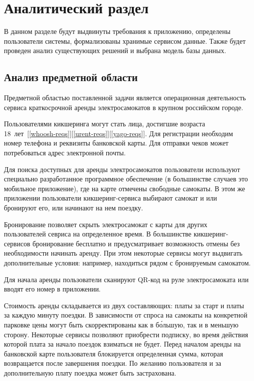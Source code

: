\chapter{Аналитический раздел}

В данном разделе будут выдвинуты требования к приложению, определены пользователи системы, формализованы хранимые сервисом данные. Также будет проведен анализ существующих решений и выбрана модель базы данных.

\section{Анализ предметной области}

Предметной областью поставленной задачи является операционная деятельность сервиса краткосрочной аренды электросамокатов в крупном российском городе.

Пользователями кикшеринга могут стать лица, достигшие возраста 18~лет~[\ref{whoosh-reqs}][\ref{urent-reqs}][\ref{yago-reqs}]. Для регистрации необходим номер телефона и реквизиты банковской карты. Для отправки чеков может потребоваться адрес электронной почты.

Для поиска доступных для аренды электросамокатов пользователи используют специально разработанное программное обеспечение (в большинстве случаев это мобильное приложение), где на карте отмечены свободные самокаты. В этом же приложении пользователи кикшеринг-сервиса выбирают самокат и или бронируют его, или начинают на нем поездку.

Бронирование позволяет скрыть электросамокат с карты для других пользователей севриса на определенное время. В большинстве кикшеринг-сервисов бронирование бесплатно и предусматривает возможность отмены без необходимости начинать аренду. При этом некоторые сервисы могут выдвигать дополнительные условия: например, находиться рядом с бронируемым самокатом.

Для начала аренды пользователи сканируют QR-код на руле электросамоката или вводят его номер в приложении.

Стоимость аренды складывается из двух составляющих: платы за старт и платы за каждую минуту поездки. В зависимости от спроса на самокаты на конкретной парковке цены могут быть скорректированы как в б\'{о}льшую, так и в меньшую сторону. Некоторые сервисы позволяют приобрести подписку, во время действия которой плата за начало поездок взиматься не будет. Перед началом аренды на банковской карте пользователя блокируется определенная сумма, которая возвращается после завершения поездки. По желанию пользователя и за дополнительную плату поездка может быть застрахована.


